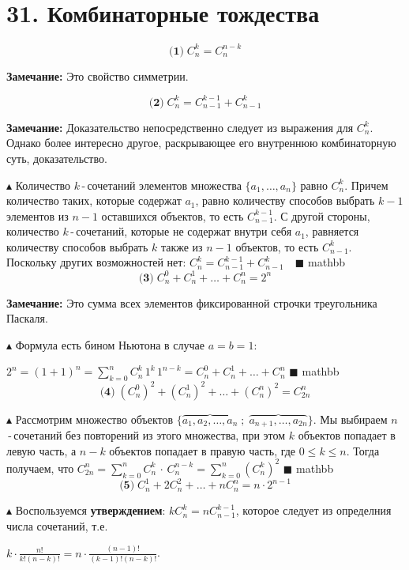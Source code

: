 \section*{31. Комбинаторные тождества}

$$\textbf{(1)} \; C_n^k = C_n^{n-k}$$

\textbf{Замечание:} Это свойство симметрии.

$$\textbf{(2)} \; C_n^k = C_{n-1}^{k-1} + C_{n-1}^{k}$$

\textbf{Замечание:} Доказательство непосредственно следует из выражения для $C_n^k$. Однако более интересно другое, раскрывающее его внутреннюю комбинаторную суть, доказательство.

$\blacktriangle$ Количество $k$\,-\,сочетаний элементов множества $\{a_1,\ldots,a_n\}$ равно $C_n^k$. Причем количество таких, которые содержат $a_1$, равно количеству способов выбрать $k-1$ элементов из $n-1$ оставшихся объектов, то есть $C_{n-1}^{k-1}$. С другой стороны, количество $k$\,-\,сочетаний, которые не содержат внутри себя $a_1$, равняется количеству способов выбрать $k$ также из $n-1$ объектов, то есть $C_{n-1}^{k}$. Поскольку других возможностей нет:
$C_n^k = C_{n-1}^{k-1} + C_{n-1}^{k} \quad \blacksquare$
mathbb $$\textbf{(3)} \; C_n^0 + C_n^1 + \ldots + C_n^n = 2^n$$

\textbf{Замечание:} Это сумма всех элементов фиксированной строчки треугольника Паскаля.

$\blacktriangle$ Формула есть бином Ньютона в случае $a=b=1$: 

$2^n = (1 + 1) ^ n = \sum_{k=0}^nC_n^k\,1^k\,1^{n-k} = C_n^0 + C_n^1 + \ldots + C_n^n$ \quad $\blacksquare$
mathbb $$\textbf{(4)} \; (C_n^0)^2 + (C_n^1)^2 + \ldots + (C_n^n)^2 = C_{2n}^n$$

$\blacktriangle$ Рассмотрим множество объектов $\{\overbrace{a_1, a_2, \ldots, a_n}\; ; \; \overbrace{a_{n+1}, \ldots, a_{2n}}\}$. Мы выбираем $n$\,-\,сочетаний без повторений из этого множества, при этом $k$ объектов попадает в левую часть, а $n-k$ объектов попадает в правую часть, где $0 \leq k \leq n$. Тогда получаем, что $C_{2n}^n = \sum_{k=0}^nC_n^k \,\cdot \, C_n^{n-k} = \sum_{k=0}^n(C_n^k)^2$ \quad $\blacksquare$
mathbb $$\textbf{(5)} \; C_n^1 + 2C_n^2 + \ldots + nC_n^n = n\cdot2^{n-1}$$

$\blacktriangle$ Воспользуемся \textbf{утверждением}: $kC_n^k = nC_{n-1}^{k-1}$, которое следует из определния числа сочетаний, т.е. 

$k\cdot\frac{n!}{k!(n-k)!} = n \cdot \frac{(n-1)!}{(k-1)!(n-k)!}$. 

